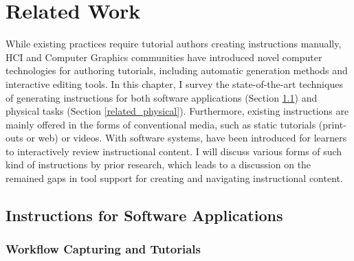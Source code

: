
\chapter{Related Work}
\label{chapter_related_work}

While existing practices require tutorial authors creating instructions manually, HCI and Computer Graphics communities have introduced novel computer technologies for authoring tutorials, including automatic generation methods and interactive editing tools.
%
In this chapter, I survey the state-of-the-art techniques of generating instructions for both software applications (Section \ref{related_software}) and physical tasks (Section \ref{related_physical}).
%
Furthermore, existing instructions are mainly offered in the forms of conventional media, such as static tutorials (print-outs or web) or videos. With software systems,  have been introduced for learners to interactively review instructional content. I will discuss various forms of such kind of instructions by prior research, which leads to a discussion on the remained gaps in tool support for creating and navigating instructional content.


\section{Instructions for Software Applications}
\label{related_software}

\subsection{Workflow Capturing and Tutorials}


